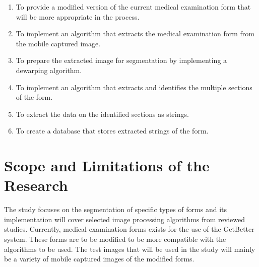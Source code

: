 \begin{comment}
Example #3:
Research Question:
   What types of storytelling knowledge are needed to generate stories?

Specific Objective:
    To identify the different types of storytelling knowledge used in generating stories

Example #4:
Research Question:
    What machine learning approaches will you utilize?

Specific Objective:
    To determine existing machine learning algorithms [that can be used in training the computer system to detect cyberbullying cases] 

Example #5: Research Question:
    How will your research output be evaluated?

Specific Objective:
    To define evaluation metrics for validating the accuracy of the translation

\end{comment}

%
%

\begin{enumerate}
   
   \item To provide a modified version of the current medical examination form that will be more appropriate in the process.
   \item To implement an algorithm that extracts the medical examination form from the mobile captured image.
   \item To prepare the extracted image for segmentation by implementing a dewarping algorithm.
   \item To implement an algorithm that extracts and identifies the multiple sections of the form.
   \item To extract the data on the identified sections as strings.
   \item To create a database that stores extracted strings of the form.
   
\end{enumerate}


\section{Scope and Limitations of the Research}
\label{sec:scopelimitations}

The study focuses on the segmentation of specific types of forms and its implementation will cover selected image processing algorithms from reviewed studies. Currently, medical examination forms exists for the use of the GetBetter system. These forms are to be modified to be more compatible with the algorithms to be used. The test images that will be used in the study will mainly be a variety of mobile captured images of the modified forms.

